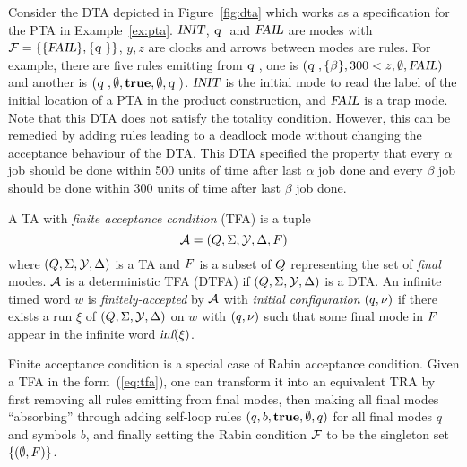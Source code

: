 \begin{example}\label{ex:dta}
{\color{red}Consider} the DTA depicted in Figure~\ref{fig:dta} which works as a specification for the PTA in Example~\ref{ex:pta}.
$\mbox{\sl INIT}$, $\mbox{\sl q }$ and $\mbox{\sl FAIL}$ are modes with $\mathcal{F} = \{ \{ \mbox{\sl FAIL} \}, \{ \mbox{\sl q } \} \}$, $y,z$ are clocks and arrows between modes are rules.
For example, there are five rules emitting from $\mbox{\sl q }$, one is
$(\mbox{\sl q }, \{\beta\}, 300 < z, \emptyset, \mbox{\sl FAIL})$ and another is
$(\mbox{\sl q }, \emptyset, \mathbf{true},\emptyset, \mbox{\sl q })$.
$\mbox{\sl INIT}$ is the initial mode to read the label of the initial location of a PTA in the product construction, and $\mbox{\sl FAIL}$ is a trap mode.
Note that this DTA does not satisfy the totality condition. However, this can be remedied by adding rules leading to a deadlock mode without changing the acceptance behaviour of the DTA.
This DTA specified the property that every $\alpha$ job should be done within 500 units
of time after last $\alpha$ job done and every $\beta$ job should be done within
300 units of time after last $\beta$ job done.
\end{example}

\begin{definition}
A TA with \emph{finite acceptance condition} (TFA) is a tuple
\begin{equation}\label{eq:tfa}
    \mathcal{A}=(Q,\Sigma,\mathcal{Y},\Delta,F)
\end{equation}
where $(Q,\Sigma,\mathcal{Y},\Delta)$ is a TA and $F$ is a subset of $Q$
representing the set of \emph{final} modes.
$\mathcal{A}$ is a deterministic TFA (DTFA) if $(Q,\Sigma,\mathcal{Y},\Delta)$ is a DTA.
An infinite timed word $w$ is \emph{finitely-accepted} by
$\mathcal{A}$ with \emph{initial configuration} $(q,\nu)$ if there exists a run $\xi$ of $(Q,\Sigma,\mathcal{Y},\Delta)$ on $w$ with $(q,\nu)$ such that some final mode in $F$ appear in the infinite word
$
    \mbox{\sl inf} ( 
         \xi
     )
$.
\end{definition}

\begin{remark}\label{rmk:facc}
Finite acceptance condition is a special case of Rabin acceptance condition.
Given a TFA in the form~(\ref{eq:tfa}), one can transform it into an equivalent TRA by first removing all rules emitting from final modes,
then making all final modes ``absorbing'' through adding self-loop rules $(q,b,\mathbf{true},\emptyset,q)$ for all final modes $q$ and symbols $b$, and finally setting the Rabin condition $\mathcal{F}$ to be the singleton set $\{(\emptyset, F)\}$.
\end{remark}

